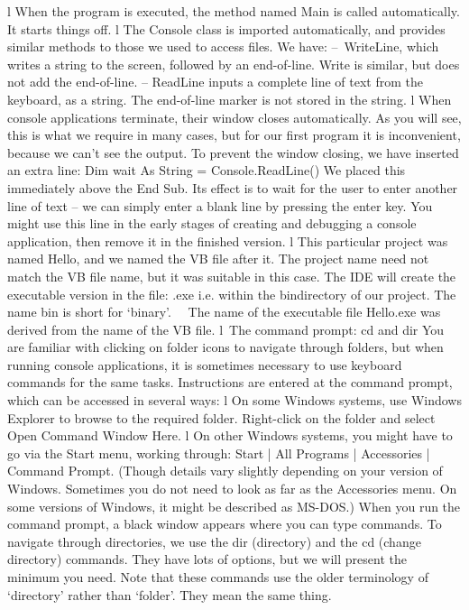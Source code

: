 l	When the program is executed, the method named Main is called automatically. It starts things off.
l	The Console class is imported automatically, and provides similar methods to those we used to access ﬁles. We have:
– WriteLine, which writes a string to the screen, followed by an end-of-line. Write is similar, but does not add the end-of-line.
–	ReadLine inputs a complete line of text from the keyboard, as a string. The end-of-line marker is not stored in the string.
l	When console applications terminate, their window closes automatically. 
As you will see, this is what we require in many cases, but for our ﬁrst program it
is inconvenient, because we can’t see the output. To prevent the window closing, we have inserted an extra line:
Dim wait As String = Console.ReadLine()
	We placed this immediately above the End Sub. Its effect is to wait for the user to enter another line of text – we can simply enter a blank line by pressing the enter key. You might use this line in the early stages of creating and debugging a console application, then remove it in the ﬁnished version.
l	This particular project was named Hello, and we named the VB ﬁle after it. The project name need not match the VB ﬁle name, but it was suitable in this case. 
The IDE will create the executable version in the ﬁle:
\Hello\bin\Debug\Hello.exe
	i.e. within the bin\Debug directory of our project. The name bin is short for ‘binary’.
	  The name of the executable ﬁle Hello.exe was derived from the name of the VB ﬁle.
l The command prompt: cd and dir
You are familiar with clicking on folder icons to navigate through folders, but when running console applications, it is sometimes necessary to use keyboard commands for the same tasks. Instructions are entered at the command prompt, which can be accessed in several ways:
l	On some Windows systems, use Windows Explorer to browse to the required folder. Right-click on the folder and select Open Command Window Here.
l	On other Windows systems, you might have to go via the Start menu, working through: Start | All Programs | Accessories | Command Prompt.
(Though details vary slightly depending on your version of Windows. Sometimes you do not need to look as far as the Accessories menu. On some versions of Windows, it might be described as MS-DOS.)
When you run the command prompt, a black window appears where you can type commands. To navigate through directories, we use the dir (directory) and the cd (change directory) commands. They have lots of options, but we will present the minimum you need. Note that these commands use the older terminology of ‘directory’ rather than ‘folder’. They mean the same thing.

